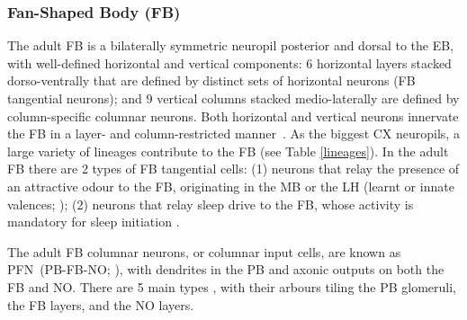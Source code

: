          \subsubsection{Fan-Shaped Body (FB)}
        The adult FB is a bilaterally symmetric neuropil posterior and dorsal to the EB, with well-defined horizontal and vertical components: 6 horizontal layers stacked dorso-ventrally that are defined by distinct sets of horizontal neurons (FB tangential neurons); and 9 vertical columns stacked medio-laterally are defined by column-specific columnar neurons.
        Both horizontal and vertical neurons innervate the FB in a layer- and column-restricted manner~\citep{heinze2017unraveling}.
        As the biggest CX neuropils, a large variety of lineages contribute to the FB (see Table \ref{lineages}).
        In the adult FB there are 2 types of FB tangential cells: (1) neurons that relay the presence of an attractive odour to the FB, originating in the MB or the LH (learnt or innate valences; \citep{hulse2021connectome}); (2) neurons that relay sleep drive to the FB, whose activity is mandatory for sleep initiation \citep{ShaferKeene2021sleep}. 
        
        
        The adult FB columnar neurons, or columnar input cells, are known as PFN~(PB-FB-NO; \citep{wolff2018neuroarchitecture}), with dendrites in the PB and axonic outputs on both the FB and NO.
        There are 5 main types \citep{hulse2021connectome}, with their arbours tiling the PB glomeruli, the FB layers, and the NO layers.

